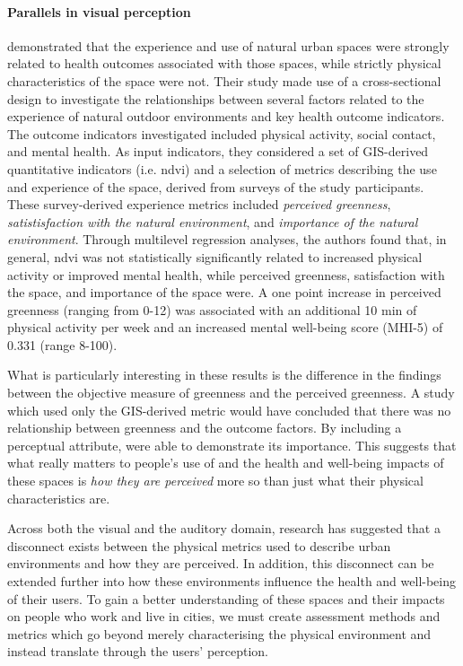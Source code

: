 \paragraph{Parallels in visual perception}
\citet{Kruize2019Exploring} demonstrated that the experience and use of natural urban spaces were strongly related to health outcomes associated with those spaces, while strictly physical characteristics of the space were not. 
Their study made use of a cross-sectional design to investigate the relationships between several factors related to the experience of natural outdoor environments and key health outcome indicators. The outcome indicators investigated included physical activity, social contact, and mental health. As input indicators, they considered a set of GIS-derived quantitative indicators (i.e. \gls{ndvi}) \citep{Smith2017Characterisation} and a selection of metrics describing the use and experience of the space, derived from surveys of the study participants. These survey-derived experience metrics included \emph{perceived greenness}, \emph{satistisfaction with the natural environment}, and \emph{importance of the natural environment}. Through multilevel regression analyses, the authors found that, in general, \gls{ndvi} was not statistically significantly related to increased physical activity or improved mental health, while perceived greenness, satisfaction with the space, and importance of the space were. A one point increase in perceived greenness (ranging from 0-12) was associated with an additional 10 min of physical activity per week and an increased mental well-being score (MHI-5) of 0.331 (range 8-100). 

What is particularly interesting in these results is the difference in the findings between the objective measure of greenness and the perceived greenness. A study which used only the GIS-derived metric would have concluded that there was no relationship between greenness and the outcome factors. By including a perceptual attribute, \citet{Kruize2019Exploring} were able to demonstrate its importance. This suggests that what really matters to people's use of and the health and well-being impacts of these spaces is \emph{how they are perceived} more so than just what their physical characteristics are. 

Across both the visual and the auditory domain, research has suggested that a disconnect exists between the physical metrics used to describe urban environments and how they are perceived. In addition, this disconnect can be extended further into how these environments influence the health and well-being of their users. To gain a better understanding of these spaces and their impacts on people who work and live in cities, we must create assessment methods and metrics which go beyond merely characterising the physical environment and instead translate through the users' perception. 


